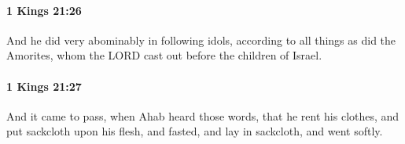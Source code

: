 		\paragraph{1 Kings 21:26} %
			\label{1KINGS-21-26}

			And he did very abominably in following idols, according to all things as did the Amorites, whom the LORD cast out before the children of Israel.


		\paragraph{1 Kings 21:27} %
			\label{1KINGS-21-27}

			And it came to pass, when Ahab heard those words, that he rent his clothes, and put sackcloth upon his flesh, and fasted, and lay in sackcloth, and went softly.


